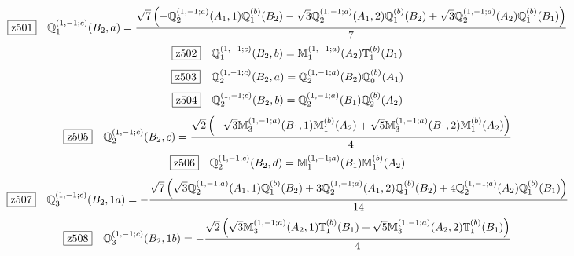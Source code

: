 \documentclass[fleqn,10pt,landscape]{jsarticle}
\begin{document}
\begin{dmath*}
\hspace*{3mm}\fbox{z501}\quad \mathbb{Q}_{1}^{(1,-1;c)}(B_{2},a)=\frac{\sqrt{7} \left(- \mathbb{Q}_{2}^{(1,-1;a)}(A_{1},1) \mathbb{Q}_{1}^{(b)}(B_{2}) - \sqrt{3} \mathbb{Q}_{2}^{(1,-1;a)}(A_{1},2) \mathbb{Q}_{1}^{(b)}(B_{2}) + \sqrt{3} \mathbb{Q}_{2}^{(1,-1;a)}(A_{2}) \mathbb{Q}_{1}^{(b)}(B_{1})\right)}{7}
\end{dmath*}
\begin{dmath*}
\hspace*{3mm}\fbox{z502}\quad \mathbb{Q}_{1}^{(1,-1;c)}(B_{2},b)=\mathbb{M}_{1}^{(1,-1;a)}(A_{2}) \mathbb{T}_{1}^{(b)}(B_{1})
\end{dmath*}
\begin{dmath*}
\hspace*{3mm}\fbox{z503}\quad \mathbb{Q}_{2}^{(1,-1;c)}(B_{2},a)=\mathbb{Q}_{2}^{(1,-1;a)}(B_{2}) \mathbb{Q}_{0}^{(b)}(A_{1})
\end{dmath*}
\begin{dmath*}
\hspace*{3mm}\fbox{z504}\quad \mathbb{Q}_{2}^{(1,-1;c)}(B_{2},b)=\mathbb{Q}_{2}^{(1,-1;a)}(B_{1}) \mathbb{Q}_{2}^{(b)}(A_{2})
\end{dmath*}
\begin{dmath*}
\hspace*{3mm}\fbox{z505}\quad \mathbb{Q}_{2}^{(1,-1;c)}(B_{2},c)=\frac{\sqrt{2} \left(- \sqrt{3} \mathbb{M}_{3}^{(1,-1;a)}(B_{1},1) \mathbb{M}_{1}^{(b)}(A_{2}) + \sqrt{5} \mathbb{M}_{3}^{(1,-1;a)}(B_{1},2) \mathbb{M}_{1}^{(b)}(A_{2})\right)}{4}
\end{dmath*}
\begin{dmath*}
\hspace*{3mm}\fbox{z506}\quad \mathbb{Q}_{2}^{(1,-1;c)}(B_{2},d)=\mathbb{M}_{1}^{(1,-1;a)}(B_{1}) \mathbb{M}_{1}^{(b)}(A_{2})
\end{dmath*}
\begin{dmath*}
\hspace*{3mm}\fbox{z507}\quad \mathbb{Q}_{3}^{(1,-1;c)}(B_{2},1a)=- \frac{\sqrt{7} \left(\sqrt{3} \mathbb{Q}_{2}^{(1,-1;a)}(A_{1},1) \mathbb{Q}_{1}^{(b)}(B_{2}) + 3 \mathbb{Q}_{2}^{(1,-1;a)}(A_{1},2) \mathbb{Q}_{1}^{(b)}(B_{2}) + 4 \mathbb{Q}_{2}^{(1,-1;a)}(A_{2}) \mathbb{Q}_{1}^{(b)}(B_{1})\right)}{14}
\end{dmath*}
\begin{dmath*}
\hspace*{3mm}\fbox{z508}\quad \mathbb{Q}_{3}^{(1,-1;c)}(B_{2},1b)=- \frac{\sqrt{2} \left(\sqrt{3} \mathbb{M}_{3}^{(1,-1;a)}(A_{2},1) \mathbb{T}_{1}^{(b)}(B_{1}) + \sqrt{5} \mathbb{M}_{3}^{(1,-1;a)}(A_{2},2) \mathbb{T}_{1}^{(b)}(B_{1})\right)}{4}
\end{dmath*}
\end{document}
